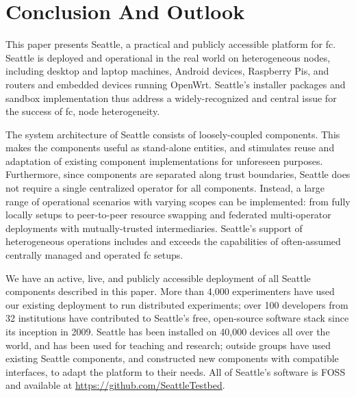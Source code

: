 \section{Conclusion And Outlook}

This paper presents Seattle, a practical and publicly accessible
platform for \gls{fc}. Seattle is deployed and operational in the
real world on heterogeneous nodes,
including desktop and laptop machines, Android devices,
Raspberry Pis,
and routers and embedded devices running OpenWrt.
Seattle's installer packages and sandbox implementation
thus address a widely-recognized and central issue for the
success of \gls{fc}, node heterogeneity.

The system architecture of Seattle consists of loosely-coupled
components. This makes the components useful as stand-alone entities,
and stimulates reuse and adaptation of existing component
implementations for unforeseen purposes.
Furthermore, since components are separated along trust boundaries,
Seattle does not require a single centralized operator for all
components. Instead, a large range of operational scenarios with
varying scopes can be implemented: from fully locally setups to
peer-to-peer resource swapping and federated multi-operator
deployments with mutually-trusted intermediaries.
Seattle's support of heterogeneous operations includes and exceeds
the capabilities of often-assumed centrally managed and
operated \gls{fc} setups.

We have an active, live, and publicly accessible deployment of all
Seattle components described in this paper.
More than 4,000 experimenters have used our existing deployment
to run distributed experiments; over 100 developers from 32 institutions
have contributed to Seattle's free, open-source software stack since
its inception in 2009.
Seattle has been installed on 40,000 devices all over the world, and
has been used
for teaching and research; outside groups have used existing Seattle
components, and constructed new components with compatible interfaces,
to adapt the platform to their needs.
All of Seattle's software is \acrlong{FOSS} and available at
\url{https://github.com/SeattleTestbed}.
